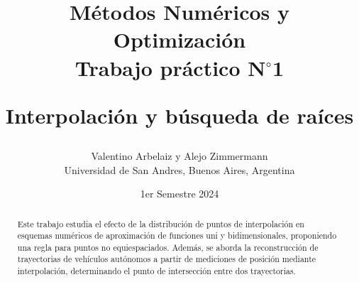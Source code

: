 \documentclass[12pt,a4]{article} %
\title{Métodos Numéricos y Optimización\\

 Trabajo práctico N$^{\circ}$1\\
\vspace{20mm}

 Interpolación y búsqueda de raíces
}
\author{Valentino Arbelaiz y Alejo Zimmermann\\ [2mm] %
\small Universidad de San Andres, Buenos Aires, Argentina}
\date{1er Semestre 2024}
\begin{document}
\vspace{1cm} %



\maketitle


\begin{abstract}
    Este trabajo estudia el efecto de la distribución de puntos de interpolación en esquemas numéricos de aproximación de funciones uni y bidimensionales, proponiendo una regla para puntos no equiespaciados. Además, se aborda la reconstrucción de trayectorias de vehículos autónomos a partir de mediciones de posición mediante interpolación, determinando el punto de intersección entre dos trayectorias.
\vspace{2mm}
\end{abstract}
\end{document}
